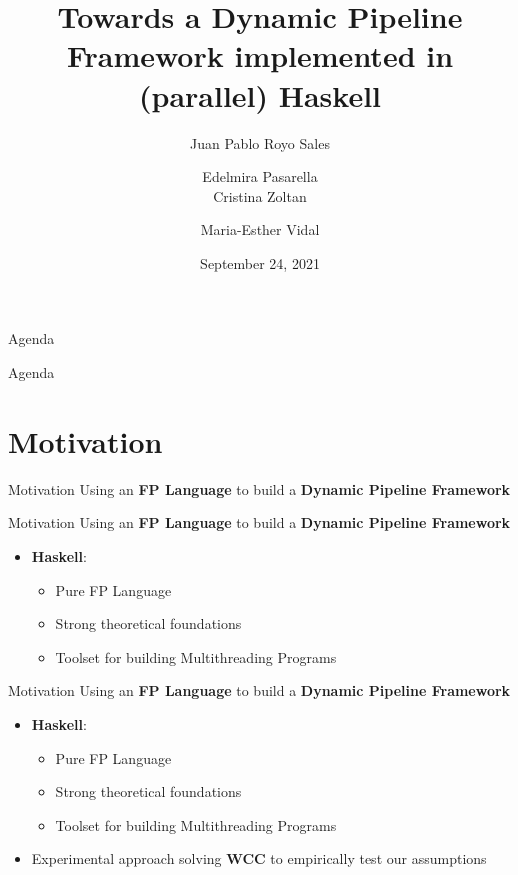 \documentclass{beamer}
\title[DP in Haskell]{Towards a Dynamic Pipeline Framework implemented in (parallel) Haskell}
\author[Royo Sales et al. (PROLE2021)] 
{%
  Juan Pablo Royo Sales\inst{1} \and Edelmira Pasarella\inst{1}\\
  Cristina Zoltan\inst{1} \and Maria-Esther Vidal\inst{2}
}
\institute[] %
{
  \inst{1}%
  Universitat Politecnica de Catalunya\\
  juan.pablo.royo@upc.edu\\
  \{zoltan,edelmira\}@cs.upc.edu \and
  \inst{2}%
  TIB/L3S Research Centre at the University of Hannover\\
  maria.vidal@tib.eu
  }
\date[September 24, 2021] %
  {September 24, 2021}
\begin{document}
  \begin{frame}
    \vspace{1.2cm}
    \titlepage
  \end{frame}

  \begin{frame}{Agenda}
    \tableofcontents
  \end{frame}
  
  \begin{frame}{Agenda}
    \section{Motivation}
    \tableofcontents[currentsection]
  \end{frame}

  \begin{frame}[fragile]{Motivation}
    Using an \textbf{FP Language} to build a \textbf{Dynamic Pipeline Framework}
  \end{frame}

  \begin{frame}[fragile]{Motivation}
    Using an \textbf{FP Language} to build a \textbf{Dynamic Pipeline Framework}

    \begin{block}

      \begin{itemize}
        \item \textbf{Haskell}: 
        \begin{itemize}
          \item Pure FP Language
          \item Strong theoretical foundations
          \item Toolset for building Multithreading Programs
        \end{itemize}
      \end{itemize}
      
    \end{block}
  \end{frame}
  
  \begin{frame}[fragile]{Motivation}
    Using an \textbf{FP Language} to build a \textbf{Dynamic Pipeline Framework}

    \begin{block}

      \begin{itemize}
        \item \textbf{Haskell}: 
        \begin{itemize}
          \item Pure FP Language
          \item Strong theoretical foundations
          \item Toolset for building Multithreading Programs
        \end{itemize}
        \item Experimental approach solving \textbf{WCC} to empirically test our assumptions
      \end{itemize}

    \end{block}
  \end{frame}
\end{document}
